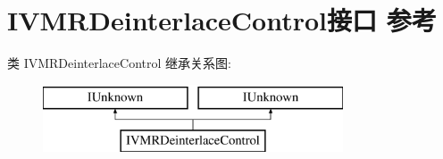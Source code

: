 \hypertarget{interface_i_v_m_r_deinterlace_control}{}\section{I\+V\+M\+R\+Deinterlace\+Control接口 参考}
\label{interface_i_v_m_r_deinterlace_control}
类 I\+V\+M\+R\+Deinterlace\+Control 继承关系图\+:\begin{figure}[H]
\begin{center}
\leavevmode
\includegraphics[height=2.000000cm]{interface_i_v_m_r_deinterlace_control}
\end{center}
\end{figure}
